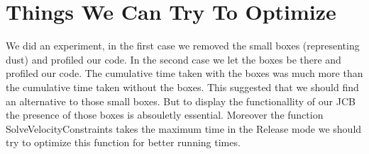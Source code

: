 \documentclass[11pt]{article}
\begin{document}
\section{Things We Can Try To Optimize}
	We did an experiment, in the first case we removed the small boxes (representing dust) and profiled our code. In the second case we let the boxes be there and profiled our code. The cumulative time taken with the boxes was much more than the cumulative time taken without the boxes. This suggested that we should find an alternative to those small boxes. But to display the functionallity of our JCB the presence of those boxes is absouletly essential.\newline
	Moreover the function SolveVelocityConstraints takes the maximum time in the Release mode we should try to optimize this function for better running times.




\end{document}

